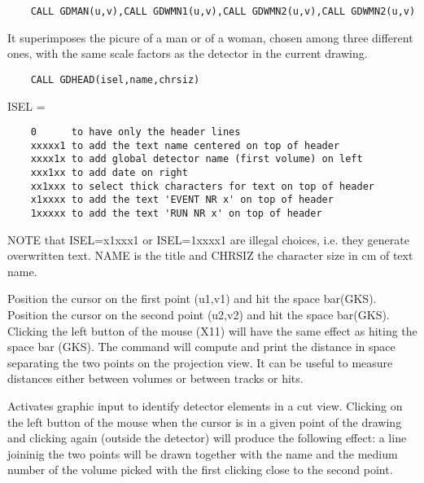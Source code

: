 \begin{verbatim}
    CALL GDMAN(u,v),CALL GDWMN1(u,v),CALL GDWMN2(u,v),CALL GDWMN2(u,v)
\end{verbatim}
   \par
It superimposes the picure of a man or of a woman, chosen among three 
   different ones, with the same scale factors as the detector in the current 
   drawing.  

\ENDCMD


\BEGARG
{}
\ENDARG

\begin{verbatim}
    CALL GDHEAD(isel,name,chrsiz)
\end{verbatim}
   \par
ISEL = 
\begin{verbatim}
    0      to have only the header lines
    xxxxx1 to add the text name centered on top of header
    xxxx1x to add global detector name (first volume) on left
    xxx1xx to add date on right
    xx1xxx to select thick characters for text on top of header
    x1xxxx to add the text 'EVENT NR x' on top of header
    1xxxxx to add the text 'RUN NR x' on top of header
\end{verbatim}
   \par
NOTE that ISEL=x1xxx1 or ISEL=1xxxx1 are illegal choices, i.e. they 
   generate overwritten text.  NAME is the title and CHRSIZ the character size 
   in cm of text name.  

\ENDCMD


   \par
Position the cursor on the first point (u1,v1) and hit the space bar(GKS).  
   Position the cursor on the second point (u2,v2) and hit the space bar(GKS). 
   Clicking the left button of the mouse (X11) will have the same effect as 
   hiting the space bar (GKS).  The command will compute and print the 
   distance in space separating the two points on the projection view. It can 
   be useful to measure distances either between volumes or between tracks or 
   hits.  

\ENDCMD


   \par
Activates graphic input to identify detector elements in a cut view. 
   Clicking on the left button of the mouse when the cursor is in a given 
   point of the drawing and clicking again (outside the detector) will produce 
   the following effect:  a line joininig the two points will be drawn 
   together with the name and the medium number of the volume picked with the 
   first clicking close to the second point.  

